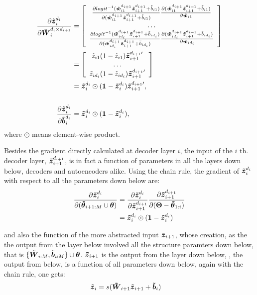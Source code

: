 \begin{equation*}
\begin{split}
  \PDV{\oDi}{\WDi}
  &= \left[\begin{array}{c}
      \PDV{logit^{-1}(\wDC_{i1}^{d_{i+1}} \zDC_{i+1}^{d_{i+1}} + \tilde{b}_{i1})} {(\wDC_{i1}^{d_{i+1}} \zDC_{i+1}^{d_{i+1}} + \tilde{b}_{i1})}
      \PDV{(\wDC_{i1}^{d_{i+1}} \zDC_{i+1}^{d_{i+1}} + \tilde{b}_{i1})}{\wDC_{i1}} \\
      \dots \\
      \PDV{logit^{-1}(\wDC_{id_i}^{d_{i+1}} \zDC_{i+1}^{d_{i+1}} + \tilde{b}_{id_i})} {(\wDC_{id_i}^{d_{i+1}} \zDC_{i+1}^{d_{i+1}} + \tilde{b}_{id_i})}
      \PDV{(\wDC_{id_i}^{d_{i+1}} \zDC_{i+1}^{d_{i+1}} + \tilde{b}_{id_i})}{\wDC_{id_i}} \\
    \end{array} \right] \\
  &= \left[\begin{array}{c}
      \tilde{z}_{i1}(1-\tilde{z}_{i1}) \zDC_{i+1}^{d_{i+1} \prime} \\
      \dots \\
      \tilde{z}_{id_i}(1-\tilde{z}_{id_i}) \zDC_{i+1}^{d_{i+1} \prime} \\
    \end{array} \right] \\
  &= \oDi \odot (\one{} - \oDi) \zDC_{i+1}^{d_{i+1} \prime}, \\
  \\
  \PDV{\oDi}{\bDi} &= \oDi \odot (\one{} - \oDi), \\
\end{split}
\end{equation*}
where $\odot$ means element-wise product. 

Besides the gradient directly calculated at decoder layer $i$, the input of the $i$ th. decoder layer, $\iDi$, is in fact a function of parameters in all the layers down below, decoders and autoencoders alike. Using the chain rule, the gradient of $\oDi$ with respect to all the parameters down below are:
\begin{equation*}
\begin{split}
  \PDV{\oDi}{(\pDC_{i+1:M} \cup \pEC)}
  &= \PDV{\oDi}{\iDi} \PDV{\iDi}{(\Par - \pDC_{1:i})} \\
  &= \oDi \odot (\one{} - \oDi) 
\end{split}
\end{equation*}

and also the function of the more abstracted input $\zDC_{i+1}$, whose creation, as the the output from the layer below involved all the structure paramters down below, that is $\{\WDC_{i:M}, \bDC_{i:M}\} \cup \pEC$. $\zDC_{i+1}$ is  the output from the layer down below, , the output from below, is a function of all parameters down below, again with the chain rule, one gets:
\begin{equation*}
\begin{split}
  \zDC_i &= s(\WDC_{i+1} \zDC_{i+1} + \bDC_i)
\end{split}
\end{equation*}

